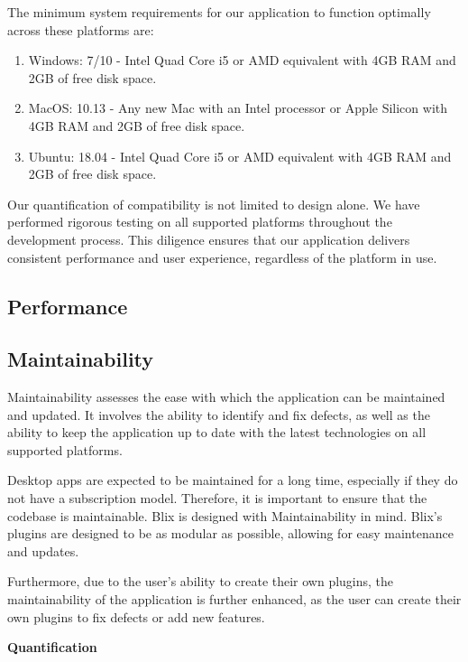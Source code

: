 \documentclass[11pt,a4paper]{article}
\begin{document}
The minimum system requirements for our application to function optimally across
these platforms are:

\begin{enumerate}
  \item Windows: 7/10 - Intel Quad Core i5 or AMD equivalent with 4GB RAM and
  2GB of free disk space.
  \item MacOS: 10.13 - Any new Mac with an Intel processor or Apple Silicon with
  4GB RAM and 2GB of free disk space.
  \item Ubuntu: 18.04 - Intel Quad Core i5 or AMD equivalent with 4GB RAM and
  2GB of free disk space.
\end{enumerate}

Our quantification of compatibility is not limited to design alone. We have
performed rigorous testing on all supported platforms throughout the development
process. This diligence ensures that our application delivers consistent
performance and user experience, regardless of the platform in use.

\subsection*{Performance}

\subsection*{Maintainability}

Maintainability assesses the ease with which the application can be maintained and updated.
It involves the ability to identify and fix defects, as well as the ability to keep the application up to date with the latest technologies on all 
supported platforms.

Desktop apps are expected to be maintained for a long time, especially if they do not have a subscription model. Therefore, it is important to ensure that the codebase is maintainable. 
Blix is designed with Maintainability in mind. Blix's plugins are designed to be as modular as possible, allowing for easy maintenance and updates.

Furthermore, due to the user's ability to create their own plugins, the maintainability of the application is further enhanced, as the user can create their own plugins to fix defects or add new features.

{\bf Quantification}
\end{document}
